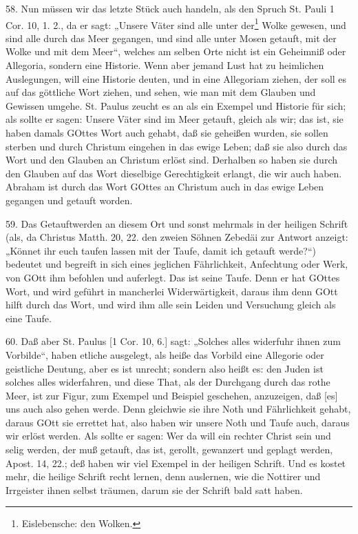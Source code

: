58. Nun müssen wir das letzte Stück auch handeln, als den Spruch St. Pauli 1 Cor. 10, 1. 2., da er sagt: „Unsere Väter sind alle unter der\footnote{Eislebensche: den Wolken.} Wolke gewesen, und sind alle durch das Meer gegangen, und sind alle unter Mosen getauft, mit der Wolke und mit dem Meer“, welches am selben Orte nicht ist ein Geheimniß oder Allegoria, sondern eine Historie. Wenn aber jemand Lust hat zu heimlichen Auslegungen, will eine Historie deuten, und in eine Allegoriam ziehen, der soll es auf das göttliche Wort ziehen, und sehen, wie man mit dem Glauben und Gewissen umgehe. St. Paulus zeucht es an als ein Exempel und Historie für sich; als sollte er sagen: Unsere Väter sind im Meer getauft, gleich als wir; das ist, sie haben damals GOttes Wort auch gehabt, daß sie geheißen wurden, sie sollen sterben und durch Christum eingehen in das ewige Leben; daß sie also durch das Wort und den Glauben an Christum erlöst sind. Derhalben so haben sie durch den Glauben auf das Wort dieselbige Gerechtigkeit erlangt, die wir auch haben. Abraham ist durch das Wort GOttes an Christum auch in das ewige Leben gegangen und getauft worden.

59. Das Getauftwerden an diesem Ort und sonst mehrmals in der heiligen Schrift (als, da Christus Matth. 20, 22. den zweien Söhnen Zebedäi zur Antwort anzeigt: „Könnet ihr euch taufen lassen mit der Taufe, damit ich getauft werde?“) bedeutet und begreift in sich eines jeglichen Fährlichkeit, Anfechtung oder Werk, von GOtt ihm befohlen und auferlegt. Das ist seine Taufe. Denn er hat GOttes Wort, und wird geführt in mancherlei Widerwärtigkeit, daraus ihm denn GOtt hilft durch das Wort, und wird ihm alle sein Leiden und Versuchung gleich als eine Taufe.

60. Daß aber St. Paulus [1 Cor. 10, 6.] sagt: „Solches alles widerfuhr ihnen zum Vorbilde“, haben etliche ausgelegt, als heiße das Vorbild eine Allegorie oder geistliche Deutung, aber es ist unrecht; sondern also heißt es: den Juden ist solches alles widerfahren, und diese That, als der Durchgang durch das rothe Meer, ist zur Figur, zum Exempel und Beispiel geschehen, anzuzeigen, daß [es] uns auch also gehen werde. Denn gleichwie sie ihre Noth und Fährlichkeit gehabt, daraus GOtt sie errettet hat, also haben wir unsere Noth und Taufe auch, daraus wir erlöst werden. Als sollte er sagen: Wer da will ein rechter Christ sein und selig werden, der muß getauft, das ist, gerollt, gewanzert und geplagt werden, Apost. 14, 22.; deß haben wir viel Exempel in der heiligen Schrift. Und es kostet mehr, die heilige Schrift recht lernen, denn auslernen, wie die Nottirer und Irrgeister ihnen selbst träumen, darum sie der Schrift bald satt haben.

